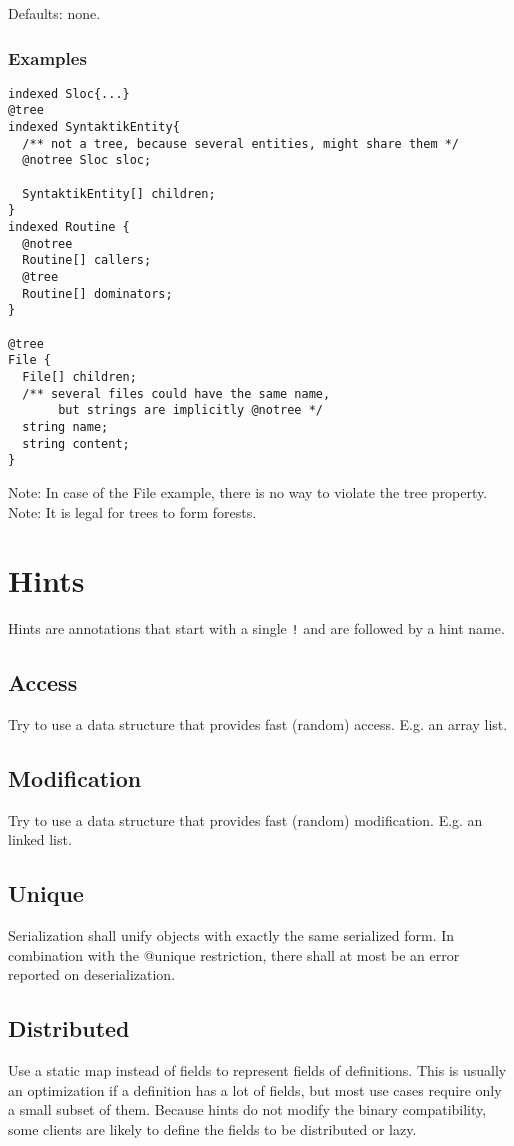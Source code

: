\documentclass[a4paper,10pt]{article}
\begin{document}
Defaults: none.

\subsubsection*{Examples}
\begin{verbatim}
indexed Sloc{...}
@tree
indexed SyntaktikEntity{
  /** not a tree, because several entities, might share them */
  @notree Sloc sloc;
  
  SyntaktikEntity[] children;
}
indexed Routine {
  @notree
  Routine[] callers;
  @tree
  Routine[] dominators;
}

@tree
File {
  File[] children;
  /** several files could have the same name,
       but strings are implicitly @notree */
  string name;
  string content;
} 
\end{verbatim}
Note: In case of the File example, there is no way to violate the tree property.
Note: It is legal for trees to form forests.


\section{Hints}
\label{hints}

Hints are annotations that start with a single \verb/!/ and are followed by a hint name.

\subsection*{Access}
Try to use a data structure that provides fast (random) access. E.g. an array list.

\subsection*{Modification}
Try to use a data structure that provides fast (random) modification. E.g. an linked list.

\subsection*{Unique}
Serialization shall unify objects with exactly the same serialized form. In combination with the @unique restriction, there shall at most be an error reported on deserialization.

\subsection*{Distributed}
Use a static map instead of fields to represent fields of definitions. This is usually an optimization if a definition has a lot of fields, but most use cases require only a small subset of them. Because hints do not modify the binary compatibility, some clients are likely to define the fields to be distributed or lazy.
\end{document}
